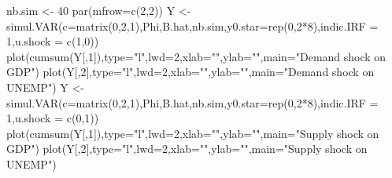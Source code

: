 \documentclass[
]{book}
\newenvironment{Shaded}{\begin{snugshade}}{\end{snugshade}}
\newcommand{\AttributeTok}[1]{\textcolor[rgb]{0.77,0.63,0.00}{#1}}
\newcommand{\DecValTok}[1]{\textcolor[rgb]{0.00,0.00,0.81}{#1}}
\newcommand{\FunctionTok}[1]{\textcolor[rgb]{0.00,0.00,0.00}{#1}}
\newcommand{\NormalTok}[1]{#1}
\newcommand{\OtherTok}[1]{\textcolor[rgb]{0.56,0.35,0.01}{#1}}
\newcommand{\SpecialCharTok}[1]{\textcolor[rgb]{0.00,0.00,0.00}{#1}}
\newcommand{\StringTok}[1]{\textcolor[rgb]{0.31,0.60,0.02}{#1}}
\theoremstyle{definition}
\theoremstyle{definition}
\theoremstyle{definition}
\theoremstyle{definition}
\theoremstyle{remark}
\begin{document}
\begin{Shaded}
\begin{Highlighting}[]
\NormalTok{nb.sim }\OtherTok{\textless{}{-}} \DecValTok{40}
\FunctionTok{par}\NormalTok{(}\AttributeTok{mfrow=}\FunctionTok{c}\NormalTok{(}\DecValTok{2}\NormalTok{,}\DecValTok{2}\NormalTok{))}
\NormalTok{Y }\OtherTok{\textless{}{-}} \FunctionTok{simul.VAR}\NormalTok{(}\AttributeTok{c=}\FunctionTok{matrix}\NormalTok{(}\DecValTok{0}\NormalTok{,}\DecValTok{2}\NormalTok{,}\DecValTok{1}\NormalTok{),Phi,B.hat,nb.sim,}\AttributeTok{y0.star=}\FunctionTok{rep}\NormalTok{(}\DecValTok{0}\NormalTok{,}\DecValTok{2}\SpecialCharTok{*}\DecValTok{8}\NormalTok{),}\AttributeTok{indic.IRF =} \DecValTok{1}\NormalTok{,}\AttributeTok{u.shock =} \FunctionTok{c}\NormalTok{(}\DecValTok{1}\NormalTok{,}\DecValTok{0}\NormalTok{))}
\FunctionTok{plot}\NormalTok{(}\FunctionTok{cumsum}\NormalTok{(Y[,}\DecValTok{1}\NormalTok{]),}\AttributeTok{type=}\StringTok{"l"}\NormalTok{,}\AttributeTok{lwd=}\DecValTok{2}\NormalTok{,}\AttributeTok{xlab=}\StringTok{""}\NormalTok{,}\AttributeTok{ylab=}\StringTok{""}\NormalTok{,}\AttributeTok{main=}\StringTok{"Demand shock on GDP"}\NormalTok{)}
\FunctionTok{plot}\NormalTok{(Y[,}\DecValTok{2}\NormalTok{],}\AttributeTok{type=}\StringTok{"l"}\NormalTok{,}\AttributeTok{lwd=}\DecValTok{2}\NormalTok{,}\AttributeTok{xlab=}\StringTok{""}\NormalTok{,}\AttributeTok{ylab=}\StringTok{""}\NormalTok{,}\AttributeTok{main=}\StringTok{"Demand shock on UNEMP"}\NormalTok{)}
\NormalTok{Y }\OtherTok{\textless{}{-}} \FunctionTok{simul.VAR}\NormalTok{(}\AttributeTok{c=}\FunctionTok{matrix}\NormalTok{(}\DecValTok{0}\NormalTok{,}\DecValTok{2}\NormalTok{,}\DecValTok{1}\NormalTok{),Phi,B.hat,nb.sim,}\AttributeTok{y0.star=}\FunctionTok{rep}\NormalTok{(}\DecValTok{0}\NormalTok{,}\DecValTok{2}\SpecialCharTok{*}\DecValTok{8}\NormalTok{),}\AttributeTok{indic.IRF =} \DecValTok{1}\NormalTok{,}\AttributeTok{u.shock =} \FunctionTok{c}\NormalTok{(}\DecValTok{0}\NormalTok{,}\DecValTok{1}\NormalTok{))}
\FunctionTok{plot}\NormalTok{(}\FunctionTok{cumsum}\NormalTok{(Y[,}\DecValTok{1}\NormalTok{]),}\AttributeTok{type=}\StringTok{"l"}\NormalTok{,}\AttributeTok{lwd=}\DecValTok{2}\NormalTok{,}\AttributeTok{xlab=}\StringTok{""}\NormalTok{,}\AttributeTok{ylab=}\StringTok{""}\NormalTok{,}\AttributeTok{main=}\StringTok{"Supply shock on GDP"}\NormalTok{)}
\FunctionTok{plot}\NormalTok{(Y[,}\DecValTok{2}\NormalTok{],}\AttributeTok{type=}\StringTok{"l"}\NormalTok{,}\AttributeTok{lwd=}\DecValTok{2}\NormalTok{,}\AttributeTok{xlab=}\StringTok{""}\NormalTok{,}\AttributeTok{ylab=}\StringTok{""}\NormalTok{,}\AttributeTok{main=}\StringTok{"Supply shock on UNEMP"}\NormalTok{)}
\end{Highlighting}
\end{Shaded}
\end{document}
